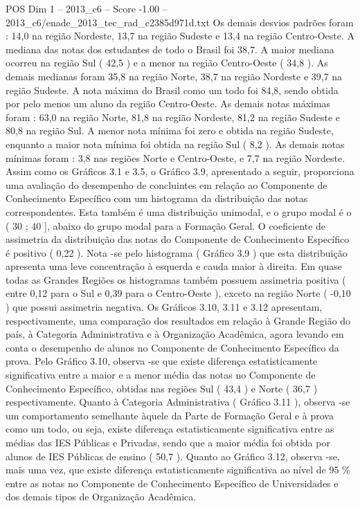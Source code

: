 \begin{textsample}{POS Dim 1 – 2013\_c6 – Score -1.00 – 2013\_c6/enade\_2013\_tec\_rad\_c2385d971d.txt}
Os demais desvios padrões foram : 14,0 na região Nordeste, 13,7 na região Sudeste e 13,4 na região Centro-Oeste.
A mediana das notas dos estudantes de todo o Brasil foi 38,7.
A maior mediana ocorreu na região Sul ( 42,5 ) e a menor na região Centro-Oeste ( 34,8 ).
As demais medianas foram 35,8 na região Norte, 38,7 na região Nordeste e 39,7 na região Sudeste.
A nota máxima do Brasil como um todo foi 84,8, sendo obtida por pelo menos um aluno da região Centro-Oeste.
As demais notas máximas foram : 63,0 na região Norte, 81,8 na região Nordeste, 81,2 na região Sudeste e 80,8 na região Sul.
A menor nota mínima foi zero e obtida na região Sudeste, enquanto a maior nota mínima foi obtida na região Sul ( 8,2 ).
As demais notas mínimas foram : 3,8 nas regiões Norte e Centro-Oeste, e 7,7 na região Nordeste.
Assim como os Gráficos 3.1 e 3.5, o Gráfico 3.9, apresentado a seguir, proporciona uma avaliação do desempenho de concluintes em relação ao Componente de Conhecimento Específico com um histograma da distribuição das notas correspondentes.
Esta também é uma distribuição unimodal, e o grupo modal é o ( 30 ; 40 ], abaixo do grupo modal para a Formação Geral.
O coeficiente de assimetria da distribuição das notas do Componente de Conhecimento Específico é positivo ( 0,22 ).
Nota -se pelo histograma ( Gráfico 3.9 ) que esta distribuição apresenta uma leve concentração à esquerda e cauda maior à direita.
Em quase todas as Grandes Regiões os histogramas também possuem assimetria positiva ( entre 0,12 para o Sul e 0,39 para o Centro-Oeste ), exceto na região Norte ( -0,10 ) que possui assimetria negativa.
Os Gráficos 3.10, 3.11 e 3.12 apresentam, respectivamente, uma comparação dos resultados em relação à Grande Região do país, à Categoria Administrativa e à Organização Acadêmica, agora levando em conta o desempenho de alunos no Componente de Conhecimento Específico da prova.
Pelo Gráfico 3.10, observa -se que existe diferença estatisticamente significativa entre a maior e a menor média das notas no Componente de Conhecimento Específico, obtidas nas regiões Sul ( 43,4 ) e Norte ( 36,7 ) respectivamente.
Quanto à Categoria Administrativa ( Gráfico 3.11 ), observa -se um comportamento semelhante àquele da Parte de Formação Geral e à prova como um todo, ou seja, existe diferença estatisticamente significativa entre as médias das IES Públicas e Privadas, sendo que a maior média foi obtida por alunos de IES Públicas de ensino ( 50,7 ).
Quanto ao Gráfico 3.12, observa -se, mais uma vez, que existe diferença estatisticamente significativa ao nível de 95 \% entre as notas no Componente de Conhecimento Específico de Universidades e dos demais tipos de Organização Acadêmica.

\end{textsample}
